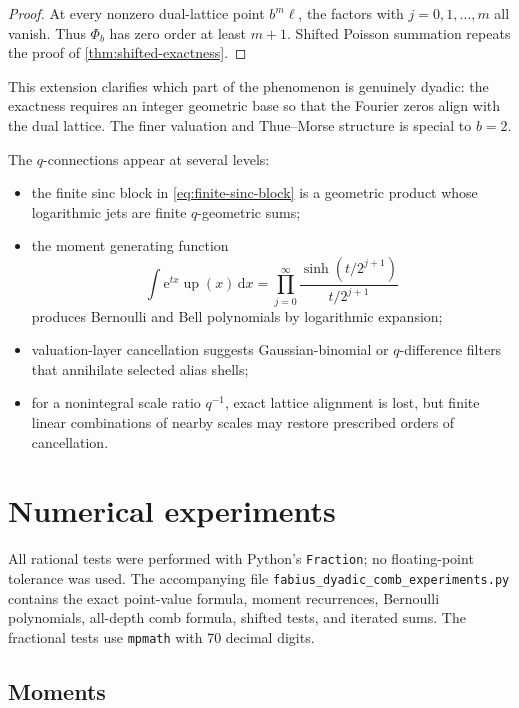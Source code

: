 \documentclass[11pt]{article}
\theoremstyle{definition}
\newcommand{\Up}{\operatorname{up}}
\newcommand{\dd}{\,\mathrm{d}}
\newcommand{\e}{\mathrm{e}}
\begin{document}
\begin{proof}
At every nonzero dual-lattice point $b^m\ell$, the factors with
$j=0,1,\dots,m$ all vanish.  Thus $\Phi_b$ has zero order at least $m+1$.
Shifted Poisson summation repeats the proof of
\cref{thm:shifted-exactness}.
\end{proof}

This extension clarifies which part of the phenomenon is genuinely dyadic:
the exactness requires an integer geometric base so that the Fourier zeros
align with the dual lattice.  The finer valuation and Thue--Morse structure
is special to $b=2$.

The $q$-connections appear at several levels:
\begin{itemize}[leftmargin=2em]
\item the finite sinc block in \eqref{eq:finite-sinc-block} is a geometric
product whose logarithmic jets are finite $q$-geometric sums;
\item the moment generating function
\[
 \int\e^{tx}\Up(x)\dd x
 =\prod_{j=0}^{\infty}\frac{\sinh(t/2^{j+1})}{t/2^{j+1}}
\]
produces Bernoulli and Bell polynomials by logarithmic expansion;
\item valuation-layer cancellation suggests Gaussian-binomial or
$q$-difference filters that annihilate selected alias shells;
\item for a nonintegral scale ratio $q^{-1}$, exact lattice alignment is lost,
but finite linear combinations of nearby scales may restore prescribed
orders of cancellation.
\end{itemize}

\section{Numerical experiments}
\label{sec:numerics}

All rational tests were performed with Python's \texttt{Fraction}; no
floating-point tolerance was used.  The accompanying file
\texttt{fabius\_dyadic\_comb\_experiments.py} contains the exact point-value
formula, moment recurrences, Bernoulli polynomials, all-depth comb formula,
shifted tests, and iterated sums.  The fractional tests use \texttt{mpmath}
with 70 decimal digits.

\subsection{Moments}
\end{document}
